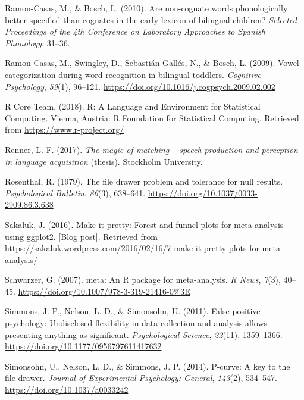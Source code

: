 \documentclass[
  english,
  man, noextraspace]{apa6}
\newlength{\cslhangindent}
\newenvironment{cslreferences}%
  {\setlength{\parindent}{0pt}%
  \everypar{\setlength{\hangindent}{\cslhangindent}}\ignorespaces}%
  {\par}
\begin{document}
\begin{cslreferences}
\leavevmode\hypertarget{ref-Ramon-Casas2010}{}%
Ramon-Casas, M., \& Bosch, L. (2010). Are non-cognate words phonologically better specified than cognates in the early lexicon of bilingual children? \emph{Selected Proceedings of the 4th Conference on Laboratory Approaches to Spanish Phonology}, 31--36.

\leavevmode\hypertarget{ref-Ramon-Casas2009}{}%
Ramon-Casas, M., Swingley, D., Sebastián-Gallés, N., \& Bosch, L. (2009). Vowel categorization during word recognition in bilingual toddlers. \emph{Cognitive Psychology}, \emph{59}(1), 96--121. \url{https://doi.org/10.1016/j.cogpsych.2009.02.002}

\leavevmode\hypertarget{ref-R}{}%
R Core Team. (2018). R: A Language and Environment for Statistical Computing. Vienna, Austria: R Foundation for Statistical Computing. Retrieved from \url{https://www.r-project.org/}

\leavevmode\hypertarget{ref-Renner2017}{}%
Renner, L. F. (2017). \emph{The magic of matching -- speech production and perception in language acquisition} (thesis). Stockholm University.

\leavevmode\hypertarget{ref-Rosenthal1979}{}%
Rosenthal, R. (1979). The file drawer problem and tolerance for null results. \emph{Psychological Bulletin}, \emph{86}(3), 638--641. \url{https://doi.org/10.1037/0033-2909.86.3.638}

\leavevmode\hypertarget{ref-Sakaluk2016}{}%
Sakaluk, J. (2016). Make it pretty: Forest and funnel plots for meta-analysis using ggplot2. {[}Blog post{]}. Retrieved from \url{https://sakaluk.wordpress.com/2016/02/16/7-make-it-pretty-plots-for-meta-analysis/}

\leavevmode\hypertarget{ref-meta}{}%
Schwarzer, G. (2007). meta: An R package for meta-analysis. \emph{R News}, \emph{7}(3), 40--45. \url{https://doi.org/10.1007/978-3-319-21416-0\%3E}

\leavevmode\hypertarget{ref-Simmons2011}{}%
Simmons, J. P., Nelson, L. D., \& Simonsohn, U. (2011). False-positive psychology: Undisclosed flexibility in data collection and analysis allows presenting anything as significant. \emph{Psychological Science}, \emph{22}(11), 1359--1366. \url{https://doi.org/10.1177/0956797611417632}

\leavevmode\hypertarget{ref-pcurve}{}%
Simonsohn, U., Nelson, L. D., \& Simmons, J. P. (2014). P-curve: A key to the file-drawer. \emph{Journal of Experimental Psychology: General}, \emph{143}(2), 534--547. \url{https://doi.org/10.1037/a0033242}


\end{cslreferences}
\end{document}
